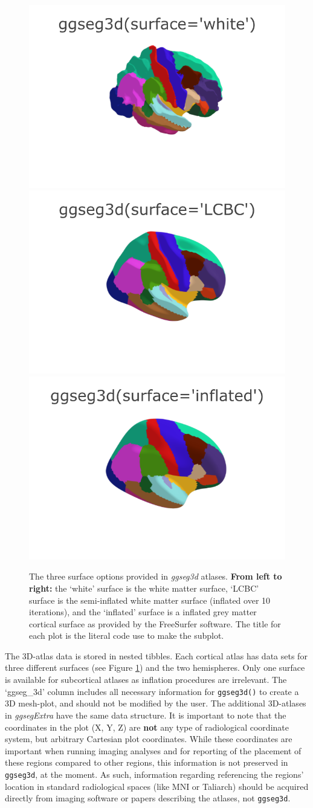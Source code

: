 \documentclass[fleqn,10pt]{wlpeerj} %
\begin{document}
\begin{figure}[H]
\includegraphics[width=0.3\linewidth]{png/ggseg3d_white} \includegraphics[width=0.3\linewidth]{png/ggseg3d} \includegraphics[width=0.3\linewidth]{png/ggseg3d_inflated} \caption{The three surface options provided in \emph{ggseg3d} atlases. \textbf{From left to right:} the `white' surface is the white matter surface, `LCBC' surface is the semi-inflated white matter surface (inflated over 10 iterations), and the `inflated' surface is a inflated grey matter cortical surface as provided by the FreeSurfer software. The title for each plot is the literal code use to make the subplot.}\label{fig:ggseg3d-1-out}
\end{figure}

The 3D-atlas data is stored in nested tibbles.
Each cortical atlas has data sets for three different surfaces (see Figure \ref{fig:ggseg3d-1-out}) and the two hemispheres.
Only one surface is available for subcortical atlases as inflation procedures are irrelevant.
The `ggseg\_3d' column includes all necessary information for \texttt{ggseg3d()} to create a 3D mesh-plot, and should not be modified by the user.
The additional 3D-atlases in \emph{ggsegExtra} have the same data structure.
It is important to note that the coordinates in the plot (X, Y, Z) are \textbf{not} any type of radiological coordinate system, but arbitrary Cartesian plot coordinates.
While these coordinates are important when running imaging analyses and for reporting of the placement of these regions compared to other regions, this information is not preserved in \texttt{ggseg3d}, at the moment.
As such, information regarding referencing the regions' location in standard radiological spaces (like MNI or Taliarch) should be acquired directly from imaging software or papers describing the atlases, not \texttt{ggseg3d}.
\end{document}
